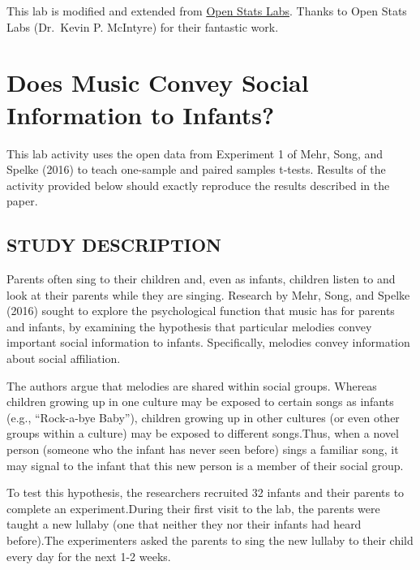 \documentclass[
]{book}
\begin{document}
This lab is modified and extended from \href{https://sites.trinity.edu/osl}{Open Stats Labs}. Thanks to Open Stats Labs (Dr.~Kevin P. McIntyre) for their fantastic work.

\hypertarget{does-music-convey-social-information-to-infants}{%
\section{Does Music Convey Social Information to Infants?}\label{does-music-convey-social-information-to-infants}}

This lab activity uses the open data from Experiment 1 of Mehr, Song, and Spelke (2016) to teach one-sample and paired samples t-tests. Results of the activity provided below should exactly reproduce the results described in the paper.

\hypertarget{study-description}{%
\subsection{STUDY DESCRIPTION}\label{study-description}}

Parents often sing to their children and, even as infants, children listen to and look at their parents while they are singing. Research by Mehr, Song, and Spelke (2016) sought to explore the psychological function that music has for parents and infants, by examining the hypothesis that particular melodies convey important social information to infants. Specifically, melodies convey information about social affiliation.

The authors argue that melodies are shared within social groups. Whereas children growing up in one culture may be exposed to certain songs as infants (e.g., ``Rock-a-bye Baby''), children growing up in other cultures (or even other groups within a culture) may be exposed to different songs.Thus, when a novel person (someone who the infant has never seen before) sings a familiar song, it may signal to the infant that this new person is a member of their social group.

To test this hypothesis, the researchers recruited 32 infants and their parents to complete an experiment.During their first visit to the lab, the parents were taught a new lullaby (one that neither they nor their infants had heard before).The experimenters asked the parents to sing the new lullaby to their child every day for the next 1-2 weeks.
\end{document}

